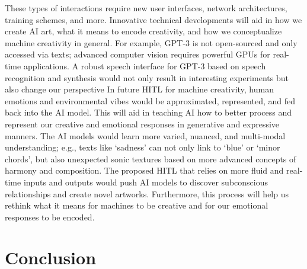 \documentclass[letterpaper]{article} %
\begin{document}
These types of interactions require new user interfaces, network architectures, training schemes, and more. Innovative technical developments will aid in how we create AI art, what it means to encode creativity, and how we conceptualize machine creativity in general. For example, GPT-3 is not open-sourced and only accessed via texts; advanced computer vision requires powerful GPUs for real-time applications. A robust speech interface for GPT-3 based on speech recognition and synthesis would not only result in interesting experiments but also change our perspective  In future HITL for machine creativity, human emotions and environmental vibes would be approximated, represented, and fed back into the AI model. This will aid in teaching AI how to better process and represent our creative and emotional responses in generative and expressive manners. The AI models would learn more varied, nuanced, and multi-modal understanding; e.g., texts like `sadness' can not only link to `blue' or `minor chords', but also unexpected sonic textures based on more advanced concepts of harmony and composition. The proposed HITL that relies on more fluid and real-time inputs and outputs would push AI models to discover subconscious relationships and create novel artworks. Furthermore, this process will help us rethink what it means for machines to be creative and for our emotional responses to be encoded.

\vspace{-3.02mm}
\section{Conclusion}
\label{conclusion}
\end{document}
